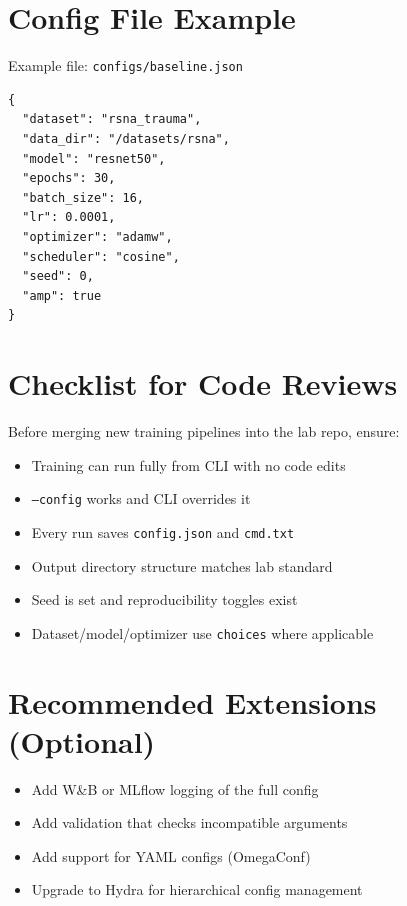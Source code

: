 \documentclass[11pt]{article}
\begin{document}
\section{Config File Example}
Example file: \texttt{configs/baseline.json}
\begin{lstlisting}
{
  "dataset": "rsna_trauma",
  "data_dir": "/datasets/rsna",
  "model": "resnet50",
  "epochs": 30,
  "batch_size": 16,
  "lr": 0.0001,
  "optimizer": "adamw",
  "scheduler": "cosine",
  "seed": 0,
  "amp": true
}
\end{lstlisting}

\section{Checklist for Code Reviews}
Before merging new training pipelines into the lab repo, ensure:
\begin{itemize}
    \item Training can run fully from CLI with no code edits
    \item \texttt{--config} works and CLI overrides it
    \item Every run saves \texttt{config.json} and \texttt{cmd.txt}
    \item Output directory structure matches lab standard
    \item Seed is set and reproducibility toggles exist
    \item Dataset/model/optimizer use \texttt{choices} where applicable
\end{itemize}

\section{Recommended Extensions (Optional)}
\begin{itemize}
    \item Add W\&B or MLflow logging of the full config
    \item Add validation that checks incompatible arguments
    \item Add support for YAML configs (OmegaConf)
    \item Upgrade to Hydra for hierarchical config management
\end{itemize}
\end{document}

